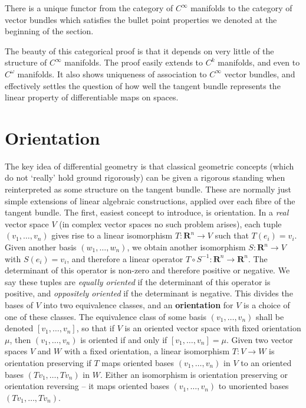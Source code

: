 \begin{theorem}
    There is a unique functor from the category of $C^\infty$ manifolds to the category of vector bundles which satisfies the bullet point properties we denoted at the beginning of the section.
\end{theorem}

The beauty of this categorical proof is that it depends on very little of the structure of $C^\infty$ manifolds. The proof easily extends to $C^k$ manifolds, and even to $C^\omega$ manifolds. It also shows uniqueness of association to $C^\infty$ vector bundles, and effectively settles the question of how well the tangent bundle represents the linear property of differentiable maps on spaces.

\section{Orientation}

The key idea of differential geometry is that classical geometric concepts (which do not `really' hold ground rigorously) can be given a rigorous standing when reinterpreted as some structure on the tangent bundle. These are normally just simple extensions of linear algebraic constructions, applied over each fibre of the tangent bundle. The first, easiest concept to introduce, is orientation. In a {\it real} vector space $V$ (in complex vector spaces no such problem arises), each tuple $(v_1, \dots, v_n)$ gives rise to a linear isomorphism $T: \mathbf{R}^n \to V$ such that $T(e_i) = v_i$. Given another basis $(w_1, \dots, w_n)$, we obtain another isomorphism $S: \mathbf{R}^n \to V$ with $S(e_i) = v_i$, and therefore a linear operator $T \circ S^{-1}: \mathbf{R}^n \to \mathbf{R}^n$. The determinant of this operator is non-zero and therefore positive or negative. We say these tuples are {\it equally oriented} if the determinant of this operator is positive, and {\it oppositely oriented} if the determinant is negative. This divides the bases of $V$ into two equivalence classes, and an {\bf orientation} for $V$ is a choice of one of these classes. The equivalence class of some basis $(v_1, \dots, v_n)$ shall be denoted $[v_1, \dots, v_n]$, so that if $V$ is an oriented vector space with fixed orientation $\mu$, then $(v_1, \dots, v_n)$ is oriented if and only if $[v_1, \dots, v_n] = \mu$. Given two vector spaces $V$ and $W$ with a fixed orientation, a linear isomorphism $T: V \to W$ is orientation preserving if $T$ maps oriented bases $(v_1, \dots, v_n)$ in $V$ to an oriented bases $(Tv_1, \dots, Tv_n)$ in $W$. Either an isomorphism is orientation preserving or orientation reversing -- it maps oriented bases $(v_1, \dots, v_n)$ to unoriented bases $(Tv_1, \dots, Tv_n)$.

